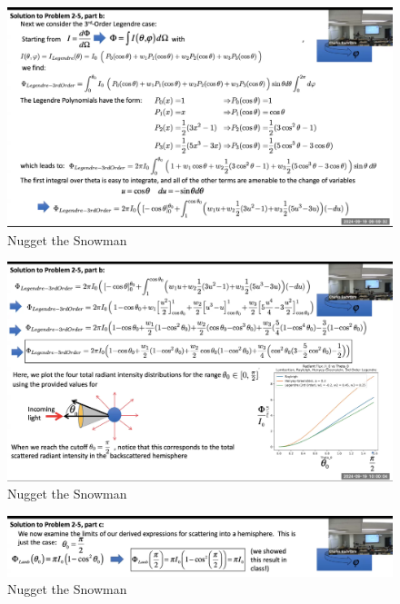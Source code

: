 \documentclass{article}
\begin{document}
\begin{figure}[h!]
\centering
\includegraphics[scale=.2]{Radiometry/Week4/Notes/PSET2/P5/Num3.png}
\caption{Nugget the Snowman}
\label{fig:Greenstein}
\end{figure}

\begin{figure}[h!]
\centering
\includegraphics[scale=.2]{Radiometry/Week4/Notes/PSET2/P5/Num4.png}
\caption{Nugget the Snowman}
\label{fig:Greenstein}
\end{figure}
\begin{figure}[h!]
\centering
\includegraphics[scale=.2]{Radiometry/Week4/Notes/PSET2/P5/Num5.png}
\caption{Nugget the Snowman}
\label{fig:Greenstein}
\end{figure}
\end{document}

